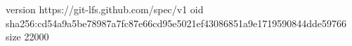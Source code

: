 version https://git-lfs.github.com/spec/v1
oid sha256:cd54a9a5be78987a7fc87e66cd95e5021ef43086851a9e1719590844dde59766
size 22000
